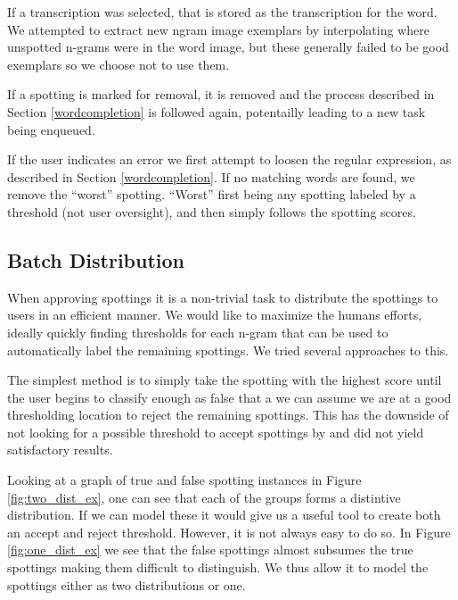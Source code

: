 \documentclass[ms,electronic,twosidetoc,letterpaper,chaptercenter,parttop,lol,lof,lot]{byumsphd}
\begin{document}
If a transcription was selected, that is stored as the transcription for the word. We attempted to extract new ngram image exemplars by interpolating where unspotted n-grams were in the word image, but these generally failed to be good exemplars so we choose not to use them.

If a spotting is marked for removal, it is removed and the process described in Section \ref{wordcompletion} is followed again, potentailly leading to a new task being enqueued.

If the user indicates an error we first attempt to loosen the regular expression, as described in Section \ref{wordcompletion}. If no matching words are found, we remove the ``worst'' spotting. ``Worst'' first being any spotting labeled by a threshold (not user oversight), and then simply follows the spotting scores.


\subsection{Batch Distribution}
When approving spottings it is a non-trivial task to distribute the spottings to users in an efficient manner. We would like to maximize the humans efforts, ideally quickly finding thresholds for each n-gram that can be used to automatically label the remaining spottings. We tried several approaches to this.

The simplest method is to simply take the spotting with the highest score until the user begins to classify enough as false that  a we can assume we are at a good thresholding location to reject the remaining spottings. 
This has the downside of not looking for a possible threshold to accept spottings by and did not yield satisfactory results.




Looking at a graph of true and false spotting instances in Figure \ref{fig:two_dist_ex}, one can see that each of the groups forms a distintive distribution. If we can model these it would give us a useful tool to create both an accept and reject threshold. However, it is not always easy to do so. In Figure \ref{fig:one_dist_ex} we see that the false spottings almost subsumes the true spottings making them difficult to distinguish. We thus allow it to model the spottings either as two distributions or one.
\end{document}
